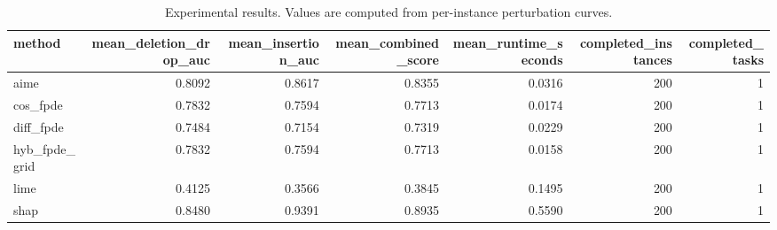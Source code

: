 \begin{table}[t]
\caption{Experimental results. Values are computed from per-instance perturbation curves.}
\label{tab:main_results_computed}
\centering
\begin{tabular}{lrrrrrr}
\toprule
method & mean\_deletion\_drop\_auc & mean\_insertion\_auc & mean\_combined\_score & mean\_runtime\_seconds & completed\_instances & completed\_tasks \\
\midrule
aime & 0.8092 & 0.8617 & 0.8355 & 0.0316 & 200 & 1 \\
cos\_fpde & 0.7832 & 0.7594 & 0.7713 & 0.0174 & 200 & 1 \\
diff\_fpde & 0.7484 & 0.7154 & 0.7319 & 0.0229 & 200 & 1 \\
hyb\_fpde\_grid & 0.7832 & 0.7594 & 0.7713 & 0.0158 & 200 & 1 \\
lime & 0.4125 & 0.3566 & 0.3845 & 0.1495 & 200 & 1 \\
shap & 0.8480 & 0.9391 & 0.8935 & 0.5590 & 200 & 1 \\
\bottomrule
\end{tabular}

\end{table}
